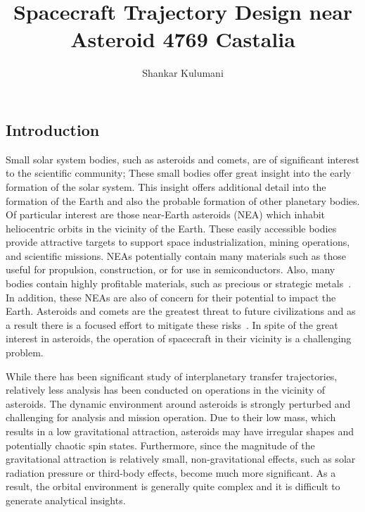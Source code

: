 \documentclass[11pt,reqno]{amsart} %
\title{\vspace{-1.0cm}Spacecraft Trajectory Design near Asteroid 4769 Castalia}
\author{Shankar Kulumani}
\date{} %
\begin{document}
\maketitle
\begin{multicols}{2}
\section{Introduction}
Small solar system bodies, such as asteroids and comets, are of significant interest to the scientific community; These small bodies offer great insight into the early formation of the solar system.
This insight offers additional detail into the formation of the Earth and also the probable formation of other planetary bodies.
Of particular interest are those near-Earth asteroids (NEA) which inhabit heliocentric orbits in the vicinity of the Earth.
These easily accessible bodies provide attractive targets to support space industrialization, mining operations, and scientific missions.
NEAs potentially contain many materials such as those useful for propulsion, construction, or for use in semiconductors.
Also, many bodies contain highly profitable materials, such as precious or strategic metals~\cite{ross2001}.
In addition, these NEAs are also of concern for their potential to impact the Earth.
Asteroids and comets are the greatest threat to future civilizations and as a result there is a focused effort to mitigate these risks~\cite{wie2008}.
In spite of the great interest in asteroids, the operation of spacecraft in their vicinity is a challenging problem.

While there has been significant study of interplanetary transfer trajectories, relatively less analysis has been conducted on operations in the vicinity of asteroids.
The dynamic environment around asteroids is strongly perturbed and challenging for analysis and mission operation.
Due to their low mass, which results in a low gravitational attraction, asteroids may have irregular shapes and potentially chaotic spin states.
Furthermore, since the magnitude of the gravitational attraction is relatively small, non-gravitational effects, such as solar radiation pressure or third-body effects, become much more significant.
As a result, the orbital environment is generally quite complex and it is difficult to generate analytical insights.


\end{multicols}
\end{document}
